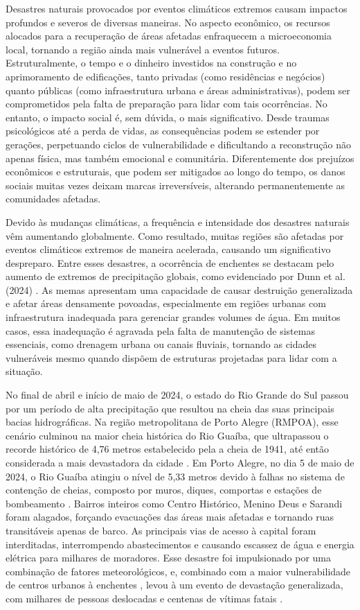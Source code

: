 Desastres naturais provocados por eventos climáticos extremos causam impactos profundos e severos de diversas maneiras.
No aspecto econômico, os recursos alocados para a recuperação de áreas afetadas enfraquecem a microeconomia local,
tornando a região ainda mais vulnerável a eventos futuros. Estruturalmente, o tempo e o dinheiro investidos na
construção e no aprimoramento de edificações, tanto privadas (como residências e negócios) quanto públicas (como
infraestrutura urbana e áreas administrativas), podem ser comprometidos pela falta de preparação para lidar com tais
ocorrências. No entanto, o impacto social é, sem dúvida, o mais significativo. Desde traumas psicológicos até a perda de
vidas, as consequências podem se estender por gerações, perpetuando ciclos de vulnerabilidade e dificultando a
reconstrução não apenas física, mas também emocional e comunitária. Diferentemente dos prejuízos econômicos e
estruturais, que podem ser mitigados ao longo do tempo, os danos sociais muitas vezes deixam marcas irreversíveis,
alterando permanentemente as comunidades afetadas.

Devido às mudanças climáticas, a frequência e intensidade dos desastres naturais vêm aumentando globalmente. Como
resultado, muitas regiões são afetadas por eventos climáticos extremos de maneira acelerada, causando um significativo
despreparo. Entre esses desastres, a ocorrência de enchentes se destacam pelo aumento de extremos de precipitação
globais, como evidenciado por Dunn et al. (2024) \cite{dunn}. As memas apresentam uma capacidade de causar destruição
generalizada e afetar áreas densamente povoadas, especialmente em regiões urbanas com infraestrutura inadequada para
gerenciar grandes volumes de água. Em muitos casos, essa inadequação é agravada pela falta de manutenção de sistemas
essenciais, como drenagem urbana ou canais fluviais, tornando as cidades vulneráveis mesmo quando dispõem de estruturas
projetadas para lidar com a situação. 

No final de abril e início de maio de 2024, o estado do Rio Grande do Sul passou por um período de alta precipitação que
resultou na cheia das suas principais bacias hidrográficas. Na região metropolitana de Porto Alegre (RMPOA), esse
cenário culminou na maior cheia histórica do Rio Guaíba, que ultrapassou o recorde histórico de 4,76 metros estabelecido
pela a cheia de 1941, até então considerada a mais devastadora da cidade \cite{dep}. Em Porto Alegre, no dia 5 de maio
de 2024, o Rio Guaíba atingiu o nível de 5,33 metros devido à falhas no sistema de contenção de cheias, composto por
muros, diques, comportas e estações de bombeamento \cite{comercio}. Bairros inteiros como Centro Histórico, Menino Deus
e Sarandi foram alagados, forçando evacuações das áreas mais afetadas e tornando ruas transitáveis apenas de barco. As
principais vias de acesso à capital foram interditadas, interrompendo abastecimentos e causando escassez de água e
energia elétrica para milhares de moradores. Esse desastre foi impulsionado por uma combinação de fatores
meteorológicos, e, combinado com a maior vulnerabilidade de centros urbanos à enchentes \cite{yang, hammond, zhang,
pereira}, levou à um evento de devastação generalizada, com milhares de pessoas deslocadas e centenas de vítimas fatais
\cite{alcantara}.

